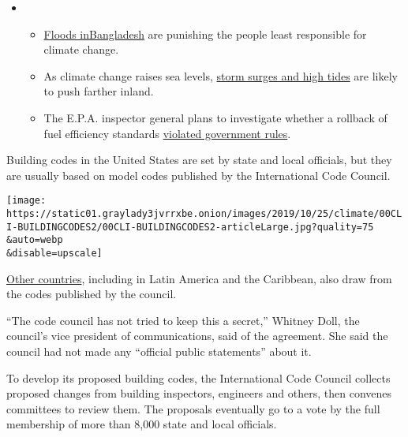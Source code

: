 \begin{itemize}
\item
  \begin{itemize}
  \tightlist
  \item
    \href{https://www.nytimes3xbfgragh.onion/2020/07/30/climate/bangladesh-floods.html?action=click\&pgtype=Article\&state=default\&region=MAIN_CONTENT_1\&context=storylines_keepup}{Floods
    in}\href{https://www.nytimes3xbfgragh.onion/2020/07/30/climate/bangladesh-floods.html?action=click\&pgtype=Article\&state=default\&region=MAIN_CONTENT_1\&context=storylines_keepup}{Bangladesh}
    are punishing the people least responsible for climate change.
  \item
    As climate change raises sea levels,
    \href{https://www.nytimes3xbfgragh.onion/2020/07/30/climate/sea-level-inland-floods.html?action=click\&pgtype=Article\&state=default\&region=MAIN_CONTENT_1\&context=storylines_keepup}{storm
    surges and high tides} are likely to push farther inland.
  \item
    The E.P.A. inspector general plans to investigate whether a rollback
    of fuel efficiency standards
    \href{https://www.nytimes3xbfgragh.onion/2020/07/27/climate/trump-fuel-efficiency-rule.html?action=click\&pgtype=Article\&state=default\&region=MAIN_CONTENT_1\&context=storylines_keepup}{violated
    government rules}.
  \end{itemize}
\end{itemize}

Building codes in the United States are set by state and local
officials, but they are usually based on model codes published by the
International Code Council.

\texttt{[image: https://static01.graylady3jvrrxbe.onion/images/2019/10/25/climate/00CLI-BUILDINGCODES2/00CLI-BUILDINGCODES2-articleLarge.jpg?quality=75\\\&auto=webp\\\&disable=upscale]}

\href{https://www.iccsafe.org/international-code-adoptions/}{Other
countries}, including in Latin America and the Caribbean, also draw from
the codes published by the council.

``The code council has not tried to keep this a secret,'' Whitney Doll,
the council's vice president of communications, said of the agreement.
She said the council had not made any ``official public statements''
about it.

To develop its proposed building codes, the International Code Council
collects proposed changes from building inspectors, engineers and
others, then convenes committees to review them. The proposals
eventually go to a vote by the full membership of more than 8,000 state
and local officials.

